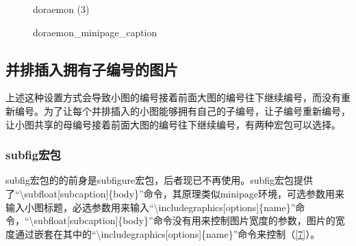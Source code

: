 \documentclass{article}
\begin{document}
\begin{figure}[htbp]
{            \begin{minipage}{.25\textwidth}
                \caption{doraemon (3)}
            \end{minipage}
        }
        \caption{doraemon\_minipage\_caption}
        \label{6}
    \end{figure}

\subsection{并排插入拥有子编号的图片}
    上述这种设置方式会导致小图的编号接着前面大图的编号往下继续编号，而没有重新编号。为了让每个并排插入的小图能够拥有自己的子编号，让子编号重新编号，让小图共享的母编号接着前面大图的编号往下继续编号，有两种宏包可以选择。

\subsubsection{subfig宏包}
    subfig宏包的的前身是subfigure宏包，后者现已不再使用。subfig宏包提供了``\textbackslash subfloat[subcaption]\{body\}''命令，其原理类似minipage环境，可选参数用来输入小图标题，必选参数用来输入``\textbackslash includegraphics[options]\{name\}''命令，``\textbackslash subfloat[subcaption]\{body\}''命令没有用来控制图片宽度的参数，图片的宽度通过嵌套在其中的``\textbackslash includegraphics[options]\{name\}''命令来控制（\ref{7}）。

\end{document}
